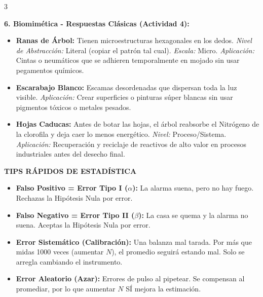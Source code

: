 \documentclass[9pt,landscape,letterpaper]{extarticle}
\begin{document}
\begin{multicols*}{3}
\begin{tcolorbox}[colback=tipsbg,colframe=tipsframe,boxrule=1pt,arc=3pt,left=3pt,right=3pt,top=3pt,bottom=3pt]
		\textbf{6. Biomimética - Respuestas Clásicas (Actividad 4):}
		\begin{itemize}
			\item \textbf{Ranas de Árbol:} Tienen microestructuras hexagonales en los dedos. \textit{Nivel de Abstracción:} Literal (copiar el patrón tal cual). \textit{Escala:} Micro. \textit{Aplicación:} Cintas o neumáticos que se adhieren temporalmente en mojado sin usar pegamentos químicos.
			\item \textbf{Escarabajo Blanco:} Escamas desordenadas que dispersan toda la luz visible. \textit{Aplicación:} Crear superficies o pinturas súper blancas sin usar pigmentos tóxicos o metales pesados.
			\item \textbf{Hojas Caducas:} Antes de botar las hojas, el árbol reabsorbe el Nitrógeno de la clorofila y deja caer lo menos energético. \textit{Nivel:} Proceso/Sistema. \textit{Aplicación:} Recuperación y reciclaje de reactivos de alto valor en procesos industriales antes del desecho final.
		\end{itemize}
	\end{tcolorbox}

	\begin{tcolorbox}[colback=white,colframe=mygreen,boxrule=1pt,arc=3pt,left=3pt,right=3pt,top=3pt,bottom=3pt]
		\textbf{\color{mygreen} TIPS RÁPIDOS DE ESTADÍSTICA}
		\begin{itemize}
			\item \textbf{Falso Positivo = Error Tipo I ($\alpha$):} La alarma suena, pero no hay fuego. Rechazas la Hipótesis Nula por error.
			\item \textbf{Falso Negativo = Error Tipo II ($\beta$):} La casa se quema y la alarma no suena. Aceptas la Hipótesis Nula por error.
			\item \textbf{Error Sistemático (Calibración):} Una balanza mal tarada. Por más que midas 1000 veces (aumentar $N$), el promedio seguirá estando mal. Solo se arregla cambiando el instrumento.
			\item \textbf{Error Aleatorio (Azar):} Errores de pulso al pipetear. Se compensan al promediar, por lo que aumentar $N$ SÍ mejora la estimación.
		\end{itemize}
	\end{tcolorbox}

\end{multicols*}
\end{document}
